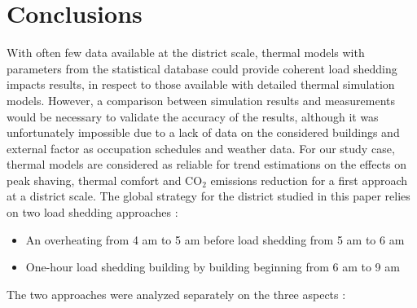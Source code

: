 \documentclass[buildings,article,submit,moreauthors,pdftex,10pt,a4paper]{mdpi}
\theoremstyle{mdpi}
\newcounter{ex}
\newcounter{re}
\theoremstyle{mdpidefinition}
\begin{document}


\section{Conclusions}
With often few data available at the district scale, thermal models with parameters from the statistical database could provide coherent load shedding impacts results, in respect to those available with detailed thermal simulation models. However, a comparison between simulation results and measurements would be necessary to validate the accuracy of the results, although it was unfortunately impossible due to a lack of data on the considered buildings and external factor as occupation schedules and weather data. For our study case, thermal models are considered as reliable for trend estimations on the effects on peak shaving, thermal comfort and CO$_{2}$ emissions reduction for a first approach at a district scale. The global strategy for the district studied in this paper relies on two load shedding approaches :
\begin{itemize}[leftmargin=*,labelsep=4mm]
    \item An overheating from 4 am to 5 am before load shedding from 5 am to 6 am
    \item One-hour load shedding building by building beginning from 6 am to 9 am
\end{itemize}
The two approaches were analyzed separately on the three aspects :
\end{document}
